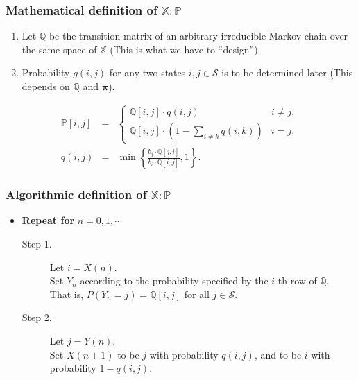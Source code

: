 \subsubsection{Mathematical definition of $ \mathbb{X} : \mathbb{P} $}
\begin{enumerate}
  \item Let $ \mathbb{Q} $ be the transition matrix of an arbitrary irreducible Markov chain over the same space of $ \mathbb{X} $ (This is what we have to ``design'').
  \item Probability $ g(i, j) $ for any two states $ i, j \in \mathcal{S} $ is to be determined later (This depends on $ \mathbb{Q} $ and $ \boldsymbol\pi $).
\end{enumerate}
\begin{eqnarray*}
\mathbb{P}[i, j] & = &
  \begin{cases}
    \mathbb{Q}[i, j] \cdot q(i, j)                        & i \neq j, \\
    \mathbb{Q}[i, j] \cdot (1 - \sum_{i \neq k} q(i, k))  & i = j,
  \end{cases} \\
q(i, j) & = & \min \left\{ \frac{b_{j} \cdot \mathbb{Q}[j, i]}{b_{i} \cdot \mathbb{Q}[i, j]}, 1 \right\}.
\end{eqnarray*}

\subsubsection{Algorithmic definition of $ \mathbb{X} : \mathbb{P} $}
\begin{itemize}
  \item \textbf{Repeat for} $ n = 0, 1, \cdots $
    \begin{description}
      \item[Step 1.] Let $ i = X(n) $. \\
        Set $ Y_{n} $ according to the probability specified by the $ i $-th row of $ \mathbb{Q} $. \\
        That is, $ P(Y_{n} = j) = \mathbb{Q}[i, j] $ for all $ j \in \mathcal{S} $.
      \item[Step 2.] Let $ j = Y(n) $. \\
        Set $ X(n + 1) $ to be $ j $ with probability $ q(i, j) $, and to be $ i $ with probability $ 1 - q(i, j) $.
    \end{description}
\end{itemize}


